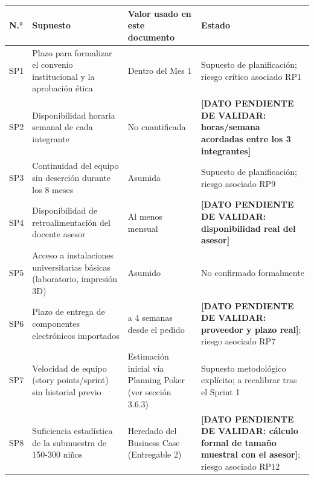 \documentclass[11pt,a4paper]{article}
\begin{document}
{\small
\begin{longtable}[]{@{}
  >{\raggedright\arraybackslash}p{}
  >{\raggedright\arraybackslash}p{}
  >{\raggedright\arraybackslash}p{}
  >{\raggedright\arraybackslash}p{}@{}}
\toprule\noalign{}
\begin{minipage}[b]{\linewidth}\raggedright
N.°
\end{minipage} & \begin{minipage}[b]{\linewidth}\raggedright
Supuesto
\end{minipage} & \begin{minipage}[b]{\linewidth}\raggedright
Valor usado en este documento
\end{minipage} & \begin{minipage}[b]{\linewidth}\raggedright
Estado
\end{minipage} \\
\midrule\noalign{}
\endhead
\bottomrule\noalign{}
\endlastfoot
SP1 & Plazo para formalizar el convenio institucional y la aprobación ética & Dentro del Mes 1 & Supuesto de planificación; riesgo crítico asociado RP1 \\
SP2 & Disponibilidad horaria semanal de cada integrante & No cuantificada & \textbf{{[}DATO PENDIENTE DE VALIDAR: horas/semana acordadas entre los 3 integrantes{]}} \\
SP3 & Continuidad del equipo sin deserción durante los 8 meses & Asumida & Supuesto de planificación; riesgo asociado RP9 \\
SP4 & Disponibilidad de retroalimentación del docente asesor & Al menos mensual & \textbf{{[}DATO PENDIENTE DE VALIDAR: disponibilidad real del asesor{]}} \\
SP5 & Acceso a instalaciones universitarias básicas (laboratorio, impresión 3D) & Asumido & No confirmado formalmente \\
SP6 & Plazo de entrega de componentes electrónicos importados & 2 a 4 semanas desde el pedido & \textbf{{[}DATO PENDIENTE DE VALIDAR: proveedor y plazo real{]}}; riesgo asociado RP7 \\
SP7 & Velocidad de equipo (story points/sprint) sin historial previo & Estimación inicial vía Planning Poker (ver sección 3.6.3) & Supuesto metodológico explícito; a recalibrar tras el Sprint 1 \\
SP8 & Suficiencia estadística de la submuestra de 150-300 niños & Heredado del Business Case (Entregable 2) & \textbf{{[}DATO PENDIENTE DE VALIDAR: cálculo formal de tamaño muestral con el asesor{]}}; riesgo asociado RP12 \\

\end{longtable}}
\end{document}
